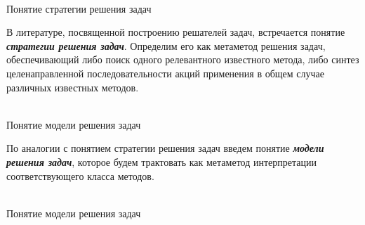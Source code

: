 
	

	

\begin{frame}{\\Понятие стратегии решения задач}
	\topline
	\justifying
	
	В литературе, посвященной построению решателей задач, встречается понятие \textbf{\textit{стратегии решения задач}}. Определим его как метаметод решения задач, обеспечивающий либо поиск одного релевантного известного метода, либо синтез целенаправленной последовательности акций применения в общем случае различных известных методов. 

    \begin{SCn}
    \end{SCn}
\end{frame}

\begin{frame}{\\Понятие модели решения задач}
	\topline
	\justifying
	
	\vspace{10mm}
	По аналогии с понятием стратегии решения задач введем понятие \textbf{\textit{модели решения задач}}, которое будем трактовать как метаметод интерпретации соответствующего класса методов.
	
    \begin{SCn}
    \end{SCn}
\end{frame}

\begin{frame}{\\Понятие модели решения задач}
	\topline
	\justifying
    \begin{SCn}
    \end{SCn}
\end{frame}

